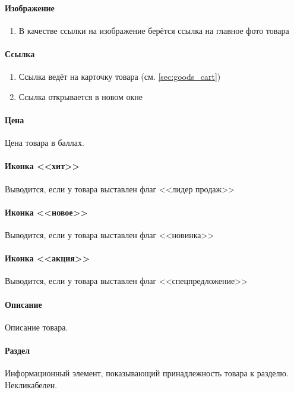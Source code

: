                 \paragraph{Изображение}
                    \begin{enumerate}
                        \item В качестве ссылки на изображение берётся 
                            ссылка на главное фото товара
                    \end{enumerate}
                \paragraph{Ссылка}
                    \begin{enumerate}
                        \item Ссылка ведёт на карточку товара (см. 
                            \ref{sec:goods_cart})
                        \item Ссылка открывается в новом окне
                    \end{enumerate}
                \paragraph{Цена}
                    Цена товара в баллах.
                \paragraph{Иконка <<хит>>}
                    Выводится, если у товара выставлен флаг <<лидер продаж>>
                \paragraph{Иконка <<новое>>}
                    Выводится, если у товара выставлен флаг <<новинка>>
                \paragraph{Иконка <<акция>>}
                    Выводится, если у товара выставлен флаг <<спецпредложение>>
                \paragraph{Описание}
                    Описание товара.
                \paragraph{Раздел}
                    Информационный элемент, показывающий принадлежность 
                        товара к разделю.
                    Некликабелен.
